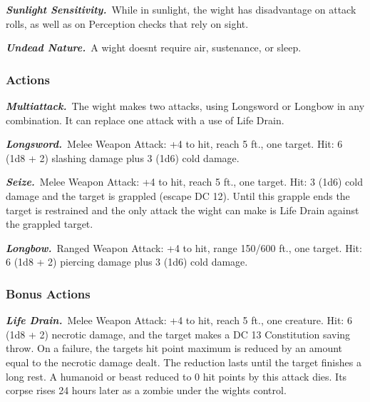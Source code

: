 \documentclass[10pt,twocolumn]{article}
\let\oldtextbf\textbf
\renewcommand{\textbf}[1]{\oldtextbf{{#1}}}
\begin{document}
\emph{\textbf{Sunlight Sensitivity.}}~While in sunlight, the wight has
disadvantage on attack rolls, as well as on Perception checks that rely
on sight.

\textbf{\emph{Undead Nature.}}~A wight doesnt require air, sustenance,
or sleep.

\subsubsection{Actions}\label{actions-8}

\emph{\textbf{Multiattack.}}~The wight makes two attacks, using
Longsword or Longbow in any combination. It can replace one attack with
a use of Life Drain.

\emph{\textbf{Longsword.}}~Melee Weapon Attack: +4 to hit, reach 5 ft.,
one target. Hit: 6 (1d8 + 2) slashing damage plus 3 (1d6) cold damage.

\textbf{\emph{Seize.}}~Melee Weapon Attack: +4 to hit, reach 5 ft., one
target. Hit: 3 (1d6) cold damage and the target is grappled (escape DC
12). Until this grapple ends the target is restrained and the only
attack the wight can make is Life Drain against the grappled target.

\textbf{\emph{Longbow.}}~Ranged Weapon Attack: +4 to hit, range 150/600
ft., one target. Hit: 6 (1d8 + 2) piercing damage plus 3 (1d6) cold
damage.

\subsubsection{Bonus Actions}\label{bonus-actions-2}

\emph{\textbf{Life Drain.}}~Melee Weapon Attack: +4 to hit, reach 5 ft.,
one creature. Hit: 6 (1d8 + 2) necrotic damage, and the target makes a
DC 13 Constitution saving throw. On a failure, the targets hit point
maximum is reduced by an amount equal to the necrotic damage dealt. The
reduction lasts until the target finishes a long rest. A humanoid or
beast reduced to 0 hit points by this attack dies. Its corpse rises 24
hours later as a zombie under the wights control.

\endgroup

\vfill\break

\begingroup

\makeatletter
{}
\monsterFont
\fontsize{9pt}{10pt}\selectfont
\setlength{\parskip}{4pt}
\makeatletter
{}
\end{document}
